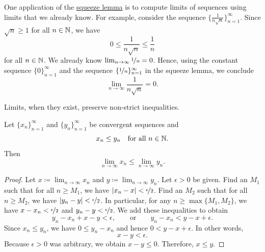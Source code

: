 \begin{myfigureht}
\caption{Squeeze lemma proof in picture.\label{figsqueeze}}
\end{myfigureht}

\begin{example}
One application of
the \hyperref[squeeze:lemma]{squeeze lemma} is to compute limits of 
sequences using limits that we already know.  For example, consider
the sequence $\bigl\{ \frac{1}{n\sqrt{n}} \bigr\}_{n=1}^\infty$.
Since $\sqrt{n} \geq 1$ for all $n \in {\mathbb{N}}$, we have
\begin{equation*}
0 \leq \frac{1}{n\sqrt{n}} \leq \frac{1}{n}
\end{equation*}
for all $n \in {\mathbb{N}}$.  We already know $\lim_{n\to\infty} \nicefrac{1}{n} = 0$. 
Hence, using
the constant sequence $\{ 0 \}_{n=1}^\infty$ and the sequence
$\{ \nicefrac{1}{n} \}_{n=1}^\infty$ in the
squeeze lemma, we conclude
\begin{equation*}
\lim_{n\to\infty} \frac{1}{n\sqrt{n}} = 0 .
\end{equation*}
\end{example}

Limits, when they exist, preserve non-strict inequalities.

\begin{lemma} \label{limandineq:lemma}
Let $\{ x_n \}_{n=1}^\infty$ and $\{ y_n \}_{n=1}^\infty$ be
convergent sequences and
\begin{equation*}
x_n \leq y_n \quad \text{for all } n \in {\mathbb{N}} .
\end{equation*}
Then
\begin{equation*}
\lim_{n\to\infty} x_n \leq
\lim_{n\to\infty} y_n .
\end{equation*}
\end{lemma}

\begin{proof}
Let $x \coloneqq \lim_{n\to\infty} x_n$ and $y \coloneqq \lim_{n\to\infty} y_n$. 
Let 
$\epsilon > 0$ be given.  Find an $M_1$ such that for all $n \geq M_1$,
we have $\lvert {x_n-x} \rvert < \nicefrac{\epsilon}{2}$.  Find an $M_2$ such that
for all $n \geq M_2$, we have
$\lvert {y_n-y} \rvert < \nicefrac{\epsilon}{2}$.  In particular,
for any $n \geq \max\{ M_1, M_2 \}$, we have
$x-x_n < \nicefrac{\epsilon}{2}$ and
$y_n-y < \nicefrac{\epsilon}{2}$.  We add these inequalities to
obtain
\begin{equation*}
y_n-x_n+x-y < \epsilon, \qquad \text{or} \qquad
y_n-x_n < y-x+ \epsilon .
\end{equation*}
Since $x_n \leq y_n$, we have
$0 \leq y_n-x_n$ and hence $0 < y-x+ \epsilon$.
In other words,
\begin{equation*}
x-y < \epsilon .
\end{equation*}
Because $\epsilon > 0$ was arbitrary, we obtain
$x-y \leq 0$.
Therefore, $x \leq y$.
\end{proof}


